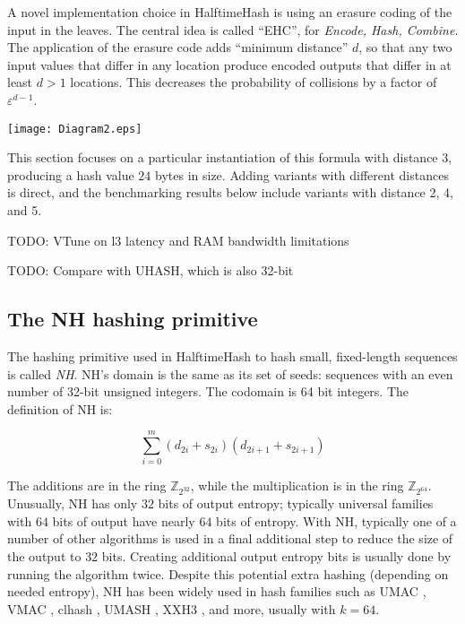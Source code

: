 \documentclass[sigconf, nonacm]{acmart}
\newcommand{\ints}{\mathbb{Z}}
\begin{document}
A novel implementation choice in HalftimeHash is using an erasure coding of the input in the leaves.
The central idea is called ``EHC'', for {\em Encode, Hash, Combine}. \cite{ehc-nandi}
The application of the erasure code adds ``minimum distance'' $d$, so that any two input values that differ in any location produce encoded outputs that differ in at least $d > 1$ locations.
This decreases the probability of collisions by a factor of $\varepsilon^{d-1}$.

\texttt{[image: Diagram2.eps]}

This section focuses on a particular instantiation of this formula with distance $3$, producing a hash value $24$ bytes in size.
Adding variants with different distances is direct, and the benchmarking results below include variants with distance 2, 4, and 5.

TODO: VTune on l3 latency and RAM bandwidth limitations

 TODO: Compare with UHASH, which is also 32-bit

\subsection{The NH hashing primitive}

The hashing primitive used in HalftimeHash to hash small, fixed-length sequences is called {\em NH}. \cite{umac}
NH's domain is the same as its set of seeds: sequences with an even number of 32-bit unsigned integers.
The codomain is 64 bit integers.
The definition of NH is:

$$\sum_{i=0}^m (d_{2i} + s_{2i})(d_{2i+1} + s_{2i+1})$$

The additions are in the ring $\ints_{2^{32}}$, while the multiplication is in the ring $\ints_{2^{64}}$.
Unusually, NH has only $32$ bits of output entropy; typically universal families with $64$ bits of output have nearly $64$ bits of entropy. \cite{umash,clhash}
With NH, typically one of a number of other algorithms is used in a final additional step to reduce the size of the output to $32$ bits.
Creating additional output entropy bits is usually done by running the algorithm twice. \cite{umash,umac}
Despite this potential extra hashing (depending on needed entropy), NH has been widely used in hash families such as UMAC \cite{umac}, VMAC \cite{vmac}, clhash \cite{clhash}, UMASH \cite{umash}, XXH3 \cite{xxh3}, and more, usually with $k = 64$.
\end{document}
